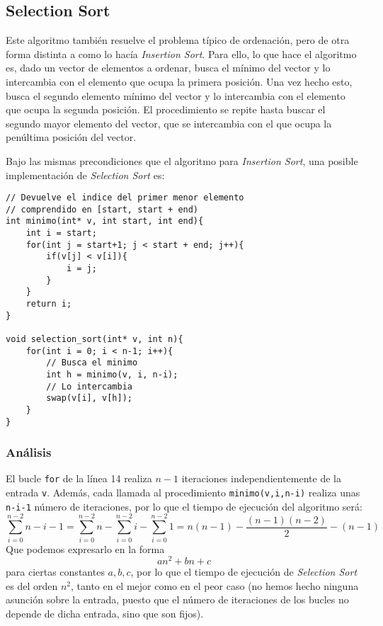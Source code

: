 \subsection{Selection Sort}
Este algoritmo también resuelve el problema típico de ordenación, pero de otra forma distinta a como lo hacía \textit{Insertion Sort}. Para ello, lo que hace el algoritmo es, dado un vector de elementos a ordenar, busca el mínimo del vector y lo intercambia con el elemento que ocupa la primera posición. Una vez hecho esto, busca el segundo elemento mínimo del vector y lo intercambia con el elemento que ocupa la segunda posición. El procedimiento se repite hasta buscar el segundo mayor elemento del vector, que se intercambia con el que ocupa la penúltima posición del vector.

Bajo las mismas precondiciones que el algoritmo para \textit{Insertion Sort}, una posible implementación de \textit{Selection Sort} es:
\begin{verbatim}
// Devuelve el indice del primer menor elemento
// comprendido en [start, start + end)
int minimo(int* v, int start, int end){
    int i = start;
    for(int j = start+1; j < start + end; j++){
        if(v[j] < v[i]){
            i = j;
        }
    }
    return i;
}

void selection_sort(int* v, int n){
    for(int i = 0; i < n-1; i++){
        // Busca el minimo
        int h = minimo(v, i, n-i);
        // Lo intercambia
        swap(v[i], v[h]);
    }
}
\end{verbatim}

\subsubsection{Análisis}
El bucle \texttt{for} de la línea 14 realiza $n-1$ iteraciones independientemente de la entrada \texttt{v}. Además, cada llamada al procedimiento \texttt{minimo(v,i,n-i)} realiza unas \texttt{n-i-1} número de iteraciones, por lo que el tiempo de ejecución del algoritmo será:
\begin{equation*}
    \sum_{i=0}^{n-2} n-i-1 = \sum_{i=0}^{n-2}n - \sum_{i=0}^{n-2}i - \sum_{i=0}^{n-2}1 = n(n-1) - \dfrac{(n-1)(n-2)}{2}-(n-1)
\end{equation*}
Que podemos expresarlo en la forma
\begin{equation*}
    an^2 + bn + c
\end{equation*}
para ciertas constantes $a,b,c$, por lo que el tiempo de ejecución de \textit{Selection Sort} es del orden $n^2$, tanto en el mejor como en el peor caso (no hemos hecho ninguna asunción sobre la entrada, puesto que el número de iteraciones de los bucles no depende de dicha entrada, sino que son fijos).\\

